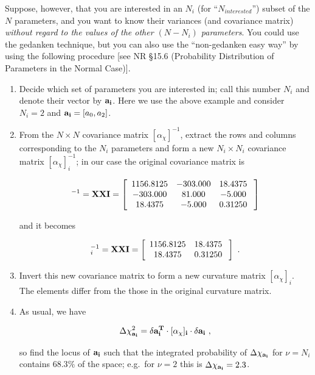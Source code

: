 \documentclass[psfig,preprint]{aastex}
\begin{document}
	Suppose, however, that you are interested in an $N_i$ (for
``$N_{interested}$'') subset of the $N$ parameters, and you want to know
their variances (and covariance matrix) {\it without regard to the
values of the other $(N - N_i)$ parameters}. You could use the gedanken
technique, but you can also use the ``non-gedanken easy way'' by using
the following procedure [see NR \S15.6 (Probability Distribution of
Parameters in the Normal Case)]. \begin{enumerate}

	\item Decide which set of parameters you are interested in; call
this number $N_i$ and denote their vector by ${\bf a_i}$.  Here we use
the above example and consider $N_i=2$ and ${\bf a_i} = [a_0,a_2]$. 

	\item From the $N \times N$ covariance matrix $[\alpha_\chi]^{-1}$,
extract the rows and columns corresponding to the $N_i$ parameters and
form a new $N_i \times N_i$ covariance matrix $[\alpha_\chi]_i^{-1}$; in our
case the original covariance matrix is 

\begin{mathletters}
\begin{eqnarray}
[\alpha_\chi]^{-1} = {\bf XXI} = \left[
\begin{array}{ccc}
    1156.8125  &   -303.000   &   18.4375  \\
     -303.000 &     81.000  &   -5.000  \\
      18.4375  &   -5.000   &  0.31250  \\
\end{array} \; \right] 
\end{eqnarray}

\noindent and it becomes

\begin{eqnarray}
[\alpha_\chi]_i^{-1} = {\bf XXI} = \left[
\begin{array}{cc}
    1156.8125  &   18.4375  \\
      18.4375  &  0.31250  \\
\end{array} \; \right] \ .
\end{eqnarray}
\end{mathletters}

	\item Invert this new covariance matrix to form a new curvature
matrix $[\alpha_\chi]_i$. The elements differ from the those in the original
curvature matrix. 

	\item As usual, we have

\begin{equation}
\Delta \chi_{\bf a_i}^2 = {\bf \delta a_i^T \cdot [\alpha_\chi]_i \cdot \delta
a_i} \ ,
\end{equation}

\noindent so find the locus of ${\bf a_i}$ such that the integrated
probability of $\Delta \chi_{\bf a_i}$ for $\nu = N_i$ contains $68.3\%$
of the space; e.g.\ for $\nu=2$ this is $\Delta \chi_{\bf a_i} = 2.3$. 

\end{enumerate}
\end{document}
